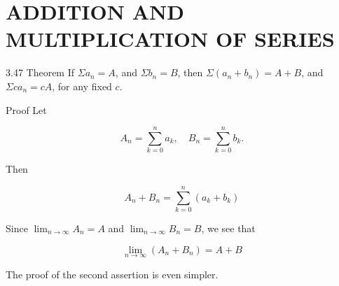 \documentclass[10pt]{article}
\begin{document}
\section*{ADDITION AND MULTIPLICATION OF SERIES}
3.47 Theorem If $\Sigma a_{n}=A$, and $\Sigma b_{n}=B$, then $\Sigma\left(a_{n}+b_{n}\right)=A+B$, and $\Sigma c a_{n}=c A$, for any fixed $c$.

Proof Let

$$
A_{n}=\sum_{k=0}^{n} a_{k}, \quad B_{n}=\sum_{k=0}^{n} b_{k} .
$$

Then

$$
A_{n}+B_{n}=\sum_{k=0}^{n}\left(a_{k}+b_{k}\right)
$$

Since $\lim _{n \rightarrow \infty} A_{n}=A$ and $\lim _{n \rightarrow \infty} B_{n}=B$, we see that

$$
\lim _{n \rightarrow \infty}\left(A_{n}+B_{n}\right)=A+B
$$

The proof of the second assertion is even simpler.
\end{document}
